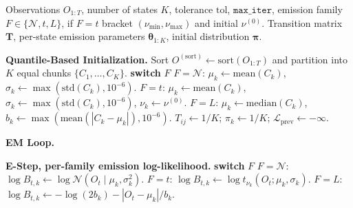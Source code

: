 \begin{algorithm}[tp]
\caption{Unified EM algorithm for the CHMM family. Lines~\ref{line:init}, \ref{line:emit}, and \ref{line:mstep} branch on the emission family $F \in \{\mathcal{N}, t, L\}$; every other line is identical across families. CHMM-N and CHMM-L instantiate classical EM; CHMM-t instantiates an ECM sequence whose second CM step updates $\nu_k$ by a one-dimensional golden-section search on the per-state $Q$-function.}
\label{alg:chmm_em}
\small
\begin{algorithmic}[1]
\REQUIRE Observations $O_{1:T}$, number of states $K$, tolerance $\text{tol}$, $\texttt{max\_iter}$, emission family $F \in \{\mathcal{N}, t, L\}$, if $F = t$ bracket $(\nu_{\min}, \nu_{\max})$ and initial $\nu^{(0)}$.
\ENSURE Transition matrix $\mathbf{T}$, per-state emission parameters $\boldsymbol\theta_{1:K}$, initial distribution $\boldsymbol{\pi}$.

\STATE \textbf{Quantile-Based Initialization.}
\STATE Sort $O^{(\text{sort})} \leftarrow \text{sort}(O_{1:T})$ and partition into $K$ equal chunks $\{C_1,\ldots,C_K\}$.
 \label{line:init}
    \STATE \textbf{switch} $F$
    \STATE \quad $F = \mathcal{N}$: $\mu_k \leftarrow \text{mean}(C_k)$, \quad $\sigma_k \leftarrow \max(\text{std}(C_k), 10^{-6})$.
    \STATE \quad $F = t$: $\mu_k \leftarrow \text{mean}(C_k)$, \quad $\sigma_k \leftarrow \max(\text{std}(C_k), 10^{-6})$, \quad $\nu_k \leftarrow \nu^{(0)}$.
    \STATE \quad $F = L$: $\mu_k \leftarrow \text{median}(C_k)$, \quad $b_k \leftarrow \max(\text{mean}(|C_k - \mu_k|), 10^{-6})$.
\ENDFOR
\STATE $T_{ij} \leftarrow 1/K$; \quad $\pi_k \leftarrow 1/K$; \quad $\mathcal{L}_{\text{prev}} \leftarrow -\infty$.

\STATE \textbf{EM Loop.}

    \STATE \textbf{E-Step, per-family emission log-likelihood.} \label{line:emit}
    \STATE \textbf{switch} $F$
    \STATE \quad $F = \mathcal{N}$: $\log B_{t,k} \leftarrow \log \mathcal{N}(O_t \mid \mu_k, \sigma_k^2)$.
    \STATE \quad $F = t$: $\log B_{t,k} \leftarrow \log t_{\nu_k}(O_t; \mu_k, \sigma_k)$.
    \STATE \quad $F = L$: $\log B_{t,k} \leftarrow -\log(2 b_k) - |O_t - \mu_k|/b_k$.


\end{algorithmic}
\end{algorithm}
